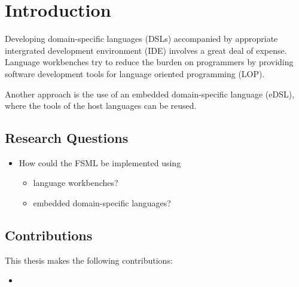 \chapter{Introduction}

Developing domain-specific languages (DSLs) accompanied by appropriate intergrated development environment (IDE) involves a great deal of expense.
Language workbenches try to reduce the burden on programmers by providing software development tools for language oriented programming (LOP).



Another approach is the use of an embedded domain-specific language (eDSL), where the tools of the host languages can be reused.


\section{Research Questions}

\begin{itemize}
	\item How could the FSML be implemented using
	\begin{itemize}
		\item language workbenches?
		\item embedded domain-specific languages?
	\end{itemize}
\end{itemize}

\section{Contributions}

This thesis makes the following contributions:
\begin{itemize}
	\item
\end{itemize}

